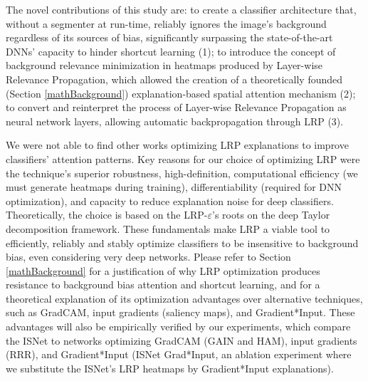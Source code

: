 \documentclass[fleqn,10pt]{wlscirep}
\begin{document}
The novel contributions of this study are: to create a classifier architecture that, without a segmenter at run-time, reliably ignores the image’s background regardless of its sources of bias, significantly surpassing the state-of-the-art DNNs' capacity to hinder shortcut learning (1); to introduce the concept of background relevance minimization in heatmaps produced by Layer-wise Relevance Propagation, which allowed the creation of a theoretically founded (Section \ref{mathBackground}) explanation-based spatial attention mechanism (2); to convert and reinterpret the process of Layer-wise Relevance Propagation as neural network layers, allowing automatic backpropagation through LRP (3).

We were not able to find other works optimizing LRP explanations to improve classifiers' attention patterns. Key reasons for our choice of optimizing LRP were the technique's superior robustness\cite{LRPRobustness}, high-definition, computational efficiency (we must generate heatmaps during training), differentiability (required for DNN optimization), and capacity to reduce explanation noise for deep classifiers\cite{LRPBook}. Theoretically, the choice is based on the LRP-$\varepsilon$'s roots on the deep Taylor decomposition framework\cite{LRPBook}. These fundamentals make LRP a viable tool to efficiently, reliably and stably optimize classifiers to be insensitive to background bias, even considering very deep networks. Please refer to Section \ref{mathBackground} for a justification of why LRP optimization produces resistance to background bias attention and shortcut learning, and for a theoretical explanation of its optimization advantages over alternative techniques, such as GradCAM\cite{GradCAM}, input gradients (saliency maps)\cite{saliency}, and Gradient*Input\cite{GradInput}. These advantages will also be empirically verified by our experiments, which compare the ISNet to networks optimizing GradCAM (GAIN\cite{GAIN} and HAM\cite{HAM}), input gradients (RRR\cite{RRR}), and Gradient*Input (ISNet Grad*Input, an ablation experiment where we substitute the ISNet's LRP heatmaps by Gradient*Input explanations).
\end{document}
